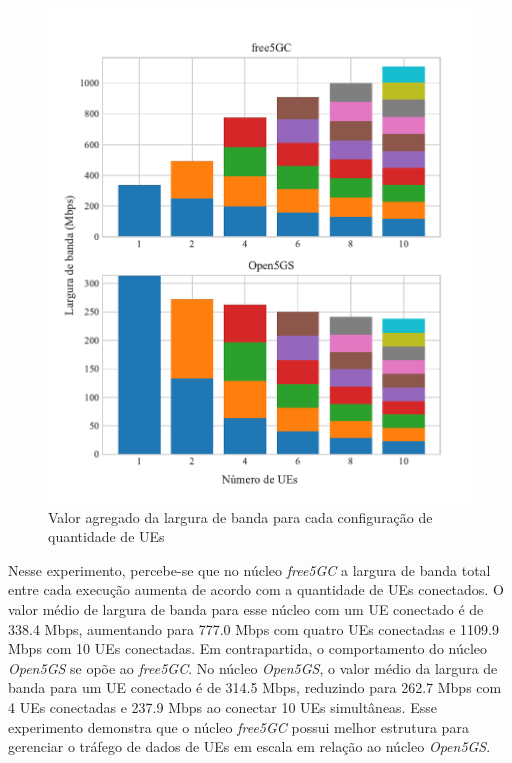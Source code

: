 \begin{figure}[H]
    \centering
    \includegraphics[width=1\textwidth]{TG2/Chapters/DataAnalysis/Figures/EXP2-ALL-12C-8GB.pdf}
    \caption{Valor agregado da largura de banda para cada configuração de quantidade de UEs}
    \label{fig:exp2_all_12-8}
\end{figure}

Nesse experimento, percebe-se que no núcleo \textit{free5GC} a largura de banda total entre cada execução aumenta de acordo com a quantidade de UEs conectados.
O valor médio de largura de banda para esse núcleo com um UE conectado é de 338.4 Mbps, aumentando para 777.0 Mbps com quatro UEs conectadas e 1109.9 Mbps com 10 UEs conectadas.
Em contrapartida, o comportamento do núcleo \textit{Open5GS} se opõe ao \textit{free5GC}. No núcleo \textit{Open5GS}, o valor médio da largura de banda para um UE conectado é de 314.5 Mbps, reduzindo para 262.7 Mbps com 4 UEs conectadas e 237.9 Mbps ao conectar 10 UEs simultâneas.
Esse experimento demonstra que o núcleo \textit{free5GC} possui melhor estrutura para gerenciar o tráfego de dados de UEs em escala em relação ao núcleo \textit{Open5GS}.


